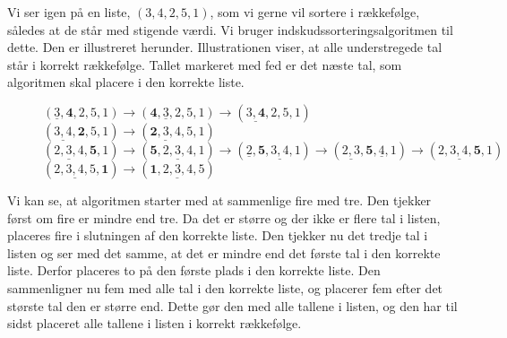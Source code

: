 \begin{exmp}
Vi ser igen på en liste, $(3,4,2,5,1)$, som vi gerne vil sortere i rækkefølge, således at de står med stigende værdi. Vi bruger indskudssorteringsalgoritmen til dette. Den er illustreret herunder. Illustrationen viser, at alle understregede tal står i korrekt rækkefølge. Tallet markeret med fed er det næste tal, som algoritmen skal placere i den korrekte liste.

\begin{figure}[H]
\label{fig:indskud}
	\begin{flushleft}
	$(\underline{3},\textbf{4},2,5,1) \rightarrow (\textbf{4}, \underline{3},2,5,1)\rightarrow (\underline{3,\textbf{4}},2,5,1)$ \\
	$(\underline{3,4},\textbf{2},5,1) \rightarrow (\underline{\textbf{2},3,4},5,1) $\\
	$(\underline{2,3,4},\textbf{5},1) \rightarrow (\textbf{5},\underline{2,3,4},1) \rightarrow (\underline{2}, \textbf{5},\underline{3,4},1) \rightarrow (\underline{2,3}, \textbf{5}, \underline{4},1) \rightarrow (\underline{2,3,4,\textbf{5}},1) $ \\
	$(\underline{2,3,4,5},\textbf{1}) \rightarrow (\underline{\textbf{1},2,3,4,5}) $\\
 	\end{flushleft}
\end{figure}

Vi kan se, at algoritmen starter med at sammenlige fire med tre. Den tjekker først om fire er mindre end tre. Da det er større og der ikke er flere tal i listen, placeres fire i slutningen af den korrekte liste. Den tjekker nu det tredje tal i listen og ser med det samme, at det er mindre end det første tal i den korrekte liste. Derfor placeres to på den første plads i den korrekte liste. Den sammenligner nu fem med alle tal i den korrekte liste, og placerer fem efter det største tal den er større end. Dette gør den med alle tallene i listen, og den har til sidst placeret alle tallene i listen i korrekt rækkefølge.


\end{exmp}